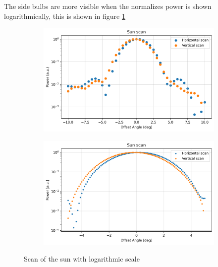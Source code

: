 The side bulbs are more visible when the normalizes power is shown logarithmically, this is shown in figure \ref{fig:sun_scan_log}
\begin{figure}[ht]
    \centering
    \begin{subfigure}[t]{0.45\linewidth}
        \includegraphics[width=\linewidth]{assets/sun_scan_low_res_log.png}
    \end{subfigure}
    \begin{subfigure}[t]{0.45\linewidth}
        \includegraphics[width=\linewidth]{assets/sun_scan_high_res_log.png}
    \end{subfigure}
    \caption{Scan of the sun with logarithmic scale}
    \label{fig:sun_scan_log}
\end{figure}

